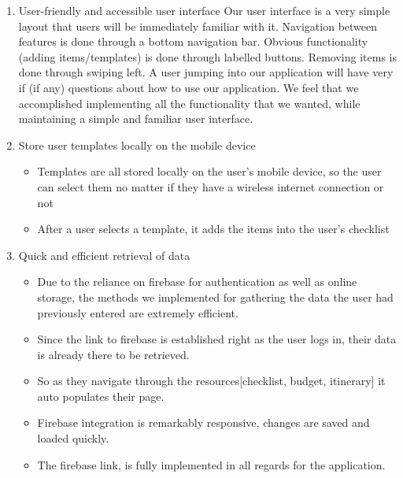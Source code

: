 \documentclass[12pt]{article}
\begin{document}
	\begin{enumerate}
		\item{User-friendly and accessible user interface}
		Our user interface is a very simple layout that users will be immediately familiar with it. Navigation between features is done through a bottom navigation bar.
		Obvious functionality (adding items/templates) is done through labelled buttons. Removing items is done through swiping left.
		A user jumping into our application will have very if (if any) questions about how to use our application.
		We feel that we accomplished implementing all the functionality that we wanted, while maintaining a simple and familiar user interface.

		\item{Store user templates locally on the mobile device}
		\begin{itemize}
			\item Templates are all stored locally on the user's mobile device, so the user can select them no matter if they have a wireless internet connection or not
			\item After a user selects a template, it adds the items into the user's checklist
		\end{itemize}

		\item{Quick and efficient retrieval of data}
			\begin{itemize}
			\item  Due to the reliance on firebase for authentication as well as online storage, the methods we implemented for gathering the data the user had previously entered
			are extremely efficient.
			\item Since the link to firebase is established right as the user logs in, their data is already there to be retrieved.
			\item So as they navigate through the resources[checklist, budget, itinerary] it auto populates their page.
			\item Firebase integration is remarkably responsive, changes are saved and loaded quickly.
			\item The firebase link, is fully implemented in all regards for the application.
			\end{itemize}
	\end{enumerate}

	\pagebreak
\end{document}

